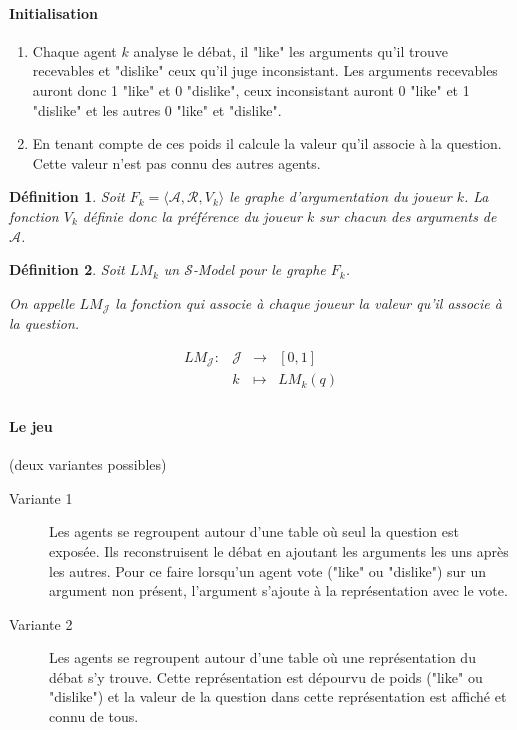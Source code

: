 \documentclass[12pt]{article}
\theoremstyle{defi}
\newtheorem{definition}{Définition}[section]
\theoremstyle{not}
\theoremstyle{prob}
\begin{document}
    \paragraph{Initialisation}
      \begin{enumerate}
        \item Chaque agent $k$ analyse le débat, il "like" les arguments qu'il trouve recevables et "dislike" ceux qu'il juge inconsistant.
        Les arguments recevables auront donc 1 "like" et 0 "dislike", ceux inconsistant auront 0 "like" et 1 "dislike" et les autres 0 "like" et "dislike".
        \item En tenant compte de ces poids il calcule la valeur qu'il associe à la question. Cette valeur n'est pas connu des autres agents.
      \end{enumerate}
      \begin{definition}
        Soit $F_k = \langle \mathcal{A}, \mathcal{R}, V_k \rangle$ le graphe d'argumentation du joueur $k$.
        La fonction $V_k$ définie donc la préférence du joueur $k$ sur chacun des arguments de $\mathcal{A}$.
      \end{definition}
      \begin{definition}
        Soit $LM_k$ un $\mathcal{S}$-Model pour le graphe $F_k$.

        On appelle $LM_\mathcal{J}$ la fonction qui associe à chaque joueur la valeur qu'il associe à la question.

        $$
          \begin{array}{rclc}
            LM_\mathcal{J} :  & \mathcal{J} & \longrightarrow & [0, 1] \\
            & k & \longmapsto & LM_k(q)\\
          \end{array}
        $$
      \end{definition}


    \paragraph{Le jeu}(deux variantes possibles)
      \begin{description}
        \item[Variante 1] Les agents se regroupent autour d'une table où seul la question est exposée. Ils reconstruisent le débat en ajoutant les arguments les uns après les autres. Pour ce faire lorsqu'un agent vote ("like" ou "dislike") sur un argument non présent, l'argument s'ajoute à la représentation avec le vote.

        \item[Variante 2] Les agents se regroupent autour d'une table où une représentation du débat s'y trouve. Cette représentation est dépourvu de poids ("like" ou "dislike") et la valeur de la question dans cette représentation est affiché et connu de tous.
      \end{description}
\end{document}

